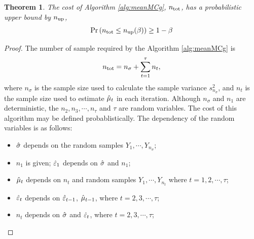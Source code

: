 \documentclass{iitthesis}
\newtheorem{theorem}{Theorem}[section]
\theoremstyle{definition}
\begin{document}
\label{sec:meanmcgcost}

\begin{theorem}\label{cost:meanMCg}
The cost of Algorithm \ref{alg:meanMCg}, $n_{\operatorname{tot}}$, has a probabilistic upper bound by $n_{\operatorname{up}}$, 
\begin{equation}
\Pr \left(n_{\operatorname{tot}}\leq n_{\operatorname{up}} (\beta)\right) \geq 1-\beta
\end{equation}
\end{theorem}
\begin{proof}
The number of sample required by the Algorithm \ref{alg:meanMCg} is $$n_{\operatorname{tot}} = n_{\sigma}+\sum_{t=1}^\tau n_t,$$ where $n_\sigma$ is the sample size used to calculate the sample variance $s_{n_\sigma}^2$, and $n_t$ is the sample size used to estimate $\hat{\mu}_t$ in each iteration. Although $n_{\sigma}$ and $n_1$ are deterministic, the $n_2, n_3,\cdots, n_\tau$ and $\tau$ are random variables. The cost of this algorithm may be defined probablistically. The dependency of the random variables is as follows:
 \begin{itemize}
 \item $\hat{\sigma}$ depends on the random samples $Y_1,\cdots, Y_{n_\sigma}$;
 \item $n_1$ is given; $\hat{\varepsilon}_1$ depends on $\hat{\sigma}$ and $n_1$; 
 \item $\hat{\mu}_t$ depends on $n_t$ and random samples $Y_1, \cdots, Y_{n_t}$ where $t = 1,2,\cdots,\tau$;
 \item $\hat{\varepsilon}_t$ depends on $\hat{\varepsilon}_{t-1}$, $\hat{\mu}_{t-1}$, where $t= 2,3,\cdots,\tau$;
 \item $n_t$ depends on  $\hat{\sigma}$ and $\hat{\varepsilon}_t$, where  $t = 2,3,\cdots,\tau$;
 \end{itemize}
 

\end{proof}
\end{document}
